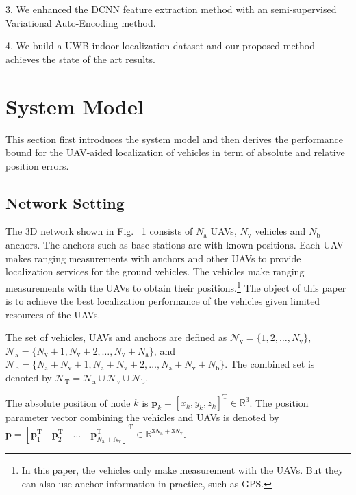\documentclass{IEEEtran}
\begin{document}
3.	We enhanced the DCNN feature extraction method with an semi-supervised Variational Auto-Encoding method.

4.	We build a UWB indoor localization dataset and our proposed method achieves the state of the art results.

\section{System Model}
This section first introduces the system model and then derives the performance bound for the UAV-aided localization of vehicles in term of absolute and relative position errors.
\subsection{Network Setting}
The 3D network shown in Fig. ~1 consists of $N_{\text{a}}$ UAVs, $N_{\text{v}}$ vehicles and $N_{\text{b}}$ anchors. The anchors such as base stations are with known positions. Each UAV makes ranging measurements with anchors and other UAVs to provide localization services for the ground vehicles. The vehicles make ranging measurements with the UAVs to obtain their positions.\footnote{In this paper, the vehicles only make measurement with the UAVs. But they can also use anchor information in practice, such as GPS. } The object of this paper is to achieve the best localization performance of the vehicles given limited resources of the UAVs.

The set of vehicles, UAVs and anchors are defined as $\mathcal{N}_{\text{v}}=\{1,2,\dots,N_{\text{v}}\}$, $\mathcal{N}_{\text{a}}=\{N_{\text{v}}+1,N_{\text{v}}+2,\dots,N_{\text{v}}+N_{\text{a}}\}$, and $\mathcal{N}_{\text{b}}=\{N_{\text{a}}+N_{\text{v}}+1,N_{\text{a}}+N_{\text{v}}+2,\dots,N_{\text{a}}+N_{\text{v}}+N_{\text{b}}\}$. The combined set is denoted by $\mathcal{N}_{\text{T}}=\mathcal{N}_{\text{a}}\cup\mathcal{N}_{\text{v}}\cup\mathcal{N}_{\text{b}}$.

The absolute position of node $k$ is $\mathbf{p}_k=[x_k,y_k,z_k]^{\text{T}}\in \mathbb{R}^3$. The position parameter vector combining the vehicles and UAVs  is denoted by $\mathbf{p}=[\mathbf{p}_1^{\text{T}}\quad \mathbf{p}_2^{\text{T}}\quad \dots \quad \mathbf{p}_{N_{\text{a}}+N_{\text{v}}}^{\text{T}} ]^{\text{T}}\in \mathbb{R}^{3N_{\text{a}}+3N_{\text{v}}}$.
\end{document}
